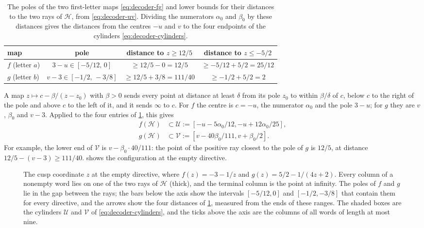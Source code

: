 \begin{table}[htbp]
\centering
\caption{The poles of the two first-letter maps \eqref{eq:decoder-fg} and lower bounds for
their distances to the two rays of $\mathcal H$, from \eqref{eq:decoder-uv}. Dividing the
numerators $\alpha_0$ and $\beta_0$ by these distances gives the distances from the centres
$-u$ and $v$ to the four endpoints of the cylinders \eqref{eq:decoder-cylinders}.}
\label{tab:poles}
\small
\renewcommand{\arraystretch}{1.15}
\begin{tabular}{@{}lccc@{}}
\toprule
map & pole & distance to $z\geqslant12/5$ & distance to $z\leqslant-5/2$\\
\midrule
$f$ (letter $a$) & $3-u\in[-5/12,\,0]$ & $\geqslant12/5-0=12/5$ & $\geqslant-5/12+5/2=25/12$\\
$g$ (letter $b$) & $v-3\in[-1/2,\,-3/8]$ & $\geqslant12/5+3/8=111/40$ & $\geqslant-1/2+5/2=2$\\
\bottomrule
\end{tabular}
\end{table}

A map $z\mapsto c-\beta/(z-z_0)$ with $\beta>0$ sends every point at distance at least
$\delta$ from its pole $z_0$ to within $\beta/\delta$ of $c$, below $c$ to the right of the
pole and above $c$ to the left of it, and it sends $\infty$ to $c$. For $f$ the centre is
$c=-u$, the numerator $\alpha_0$ and the pole $3-u$; for $g$ they are $v$, $\beta_0$ and
$v-3$. Applied to the four entries of \cref{tab:poles}, this gives
\begin{equation}\label{eq:decoder-cylinders}
 \begin{split}
 f(\mathcal H)&\subset
 \mathcal U:=[-u-5\alpha_0/12,-u+12\alpha_0/25],\\
 g(\mathcal H)&\subset
 \mathcal V:=[v-40\beta_0/111,v+\beta_0/2].
 \end{split}
\end{equation}
For example, the lower end of $\mathcal V$ is $v-\beta_0\cdot40/111$: the point of the
positive ray closest to the pole of $g$ is $12/5$, at distance $12/5-(v-3)\geqslant111/40$.
 shows the configuration at the empty directive.

\begin{figure}[htbp]
\centering

\caption{The cusp coordinate $z$ at the empty directive, where $f(z)=-3-1/z$ and
$g(z)=5/2-1/(4z+2)$. Every column of a nonempty word lies on one of the two rays of
$\mathcal H$ (thick), and the terminal column is the point at infinity. The poles of $f$ and
$g$ lie in the gap between the rays; the bars below the axis show the intervals $[-5/12,0]$ and
$[-1/2,-3/8]$ that contain them for every directive, and the arrows show the four distances of
\cref{tab:poles}, measured from the ends of these ranges. The shaded boxes are the cylinders
$\mathcal U$ and $\mathcal V$ of \eqref{eq:decoder-cylinders}, and the ticks above the axis are
the columns of all words of length at most nine.}
\label{fig:cusp-cylinders}
\end{figure}

